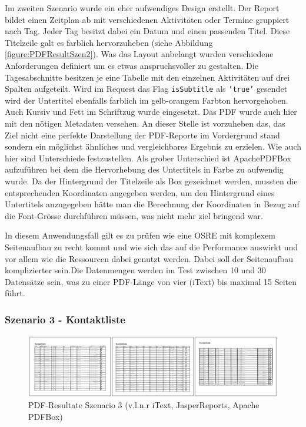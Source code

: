 \documentclass[main.tex]{subfiles}
\begin{document}
Im zweiten Szenario wurde ein eher aufwendiges Design erstellt. Der Report bildet einen Zeitplan ab mit verschiedenen Aktivitäten oder Termine gruppiert nach Tag. Jeder Tag besitzt dabei ein Datum und einen passenden Titel. Diese Titelzeile galt es farblich hervorzuheben (siehe Abbildung \ref{figure:PDFResultSzen2}). Was das Layout anbelangt wurden verschiedene Anforderungen definiert um es etwas anspruchsvoller zu gestalten. Die Tagesabschnitte besitzen je eine Tabelle mit den einzelnen Aktivitäten auf drei Spalten aufgeteilt. Wird im Request das Flag \texttt{isSubtitle} als \texttt{'true'} gesendet wird der Untertitel ebenfalls farblich im gelb-orangem Farbton hervorgehoben. Auch Kursiv und Fett im Schriftzug wurde eingesetzt. 
Das PDF wurde auch hier mit den nötigen Metadaten versehen. 
An dieser Stelle ist vorzuheben das, das Ziel nicht eine perfekte Darstellung der PDF-Reporte im Vordergrund stand sondern ein möglichst ähnliches und vergleichbares Ergebnis zu erzielen. Wie auch hier sind Unterschiede festzustellen. Als grober Unterschied ist ApachePDFBox aufzuführen bei dem die Hervorhebung des Untertitels in Farbe zu aufwendig wurde. Da der Hintergrund der Titelzeile als Box gezeichnet werden, mussten die entsprechenden Koordinaten angegeben werden, um den Hintergrund eines Untertitels anzugegeben hätte man die Berechnung der Koordinaten in Bezug auf die Font-Grösse durchführen müssen, was nicht mehr ziel bringend war.

In diesem Anwendungsfall gilt es zu prüfen wie eine OSRE mit komplexem Seitenaufbau zu recht kommt und wie sich das auf die Performance auswirkt und vor allem wie die Ressourcen dabei genutzt werden. Dabei soll der Seitenaufbau komplizierter sein.Die Datenmengen werden im Test zwischen 10 und 30 Datensätze sein, was zu einer PDF-Länge von vier (iText) bis maximal 15 Seiten führt.

\subsubsection{Szenario 3 - Kontaktliste}

\begin{figure}[h]
\includegraphics[width=\textwidth]{mainpart/3_methodik_evaluation_img/Szenario3PDF.PNG}
 \caption{PDF-Resultate Szenario 3 (v.l.n.r iText, JasperReports, Apache PDFBox)}
 \label{figure:PDFResultSzen3}
\end{figure}
\end{document}
